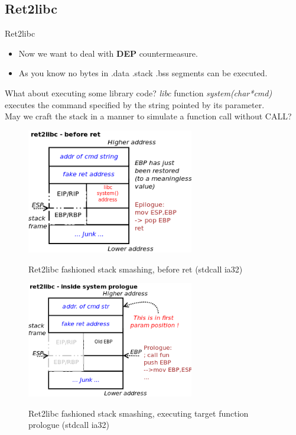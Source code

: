 \subsection{Ret2libc}
\begin{frame}{Ret2libc}

\begin{itemize}
\item Now we want to deal with {\bf DEP} countermeasure.
\item As you know no bytes in .data .stack .bss segments can be executed.
\end{itemize}

\begin{block}{What about executing some library code?}
\emph{libc} function \emph{system(char*cmd)} executes the command specified by the string pointed by its parameter. \\
May we craft the stack in a manner to simulate a function call without CALL?
\end{block}

\framebreak
	\begin{figure}
        \includegraphics[width=0.65\textwidth]{imgs/ret2libc-1.png}
        \label{fig:ret2libc-1}
        \caption{Ret2libc fashioned stack smashing, before ret (stdcall ia32)}
    \end{figure}	
\framebreak
	\begin{figure}
        \includegraphics[width=0.65\textwidth]{imgs/ret2libc-2.png}
        \label{fig:ret2libc-2}
        \caption{Ret2libc fashioned stack smashing, executing target function prologue (stdcall ia32)}
    \end{figure}

\end{frame}


